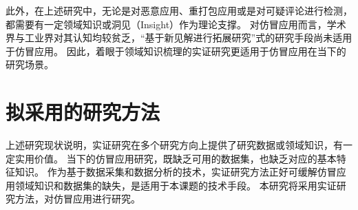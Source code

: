 此外，在上述研究中，无论是对恶意应用、重打包应用或是对可疑评论进行检测，都需要有一定领域知识或洞见（Insight）作为理论支撑。
对仿冒应用而言，学术界与工业界对其认知均较贫乏，``基于新见解进行拓展研究''式的研究手段尚未适用于仿冒应用。
因此，着眼于领域知识梳理的实证研究更适用于仿冒应用在当下的研究场景。
%
%
%

\section{拟采用的研究方法}
上述研究现状说明，实证研究在多个研究方向上提供了研究数据或领域知识，有一定实用价值。
当下的仿冒应用研究，既缺乏可用的数据集，也缺乏对应的基本特征知识。
作为基于数据采集和数据分析的技术，实证研究方法正好可缓解仿冒应用领域知识和数据集的缺失，是适用于本课题的技术手段。
本研究将采用实证研究方法，对仿冒应用进行研究。

